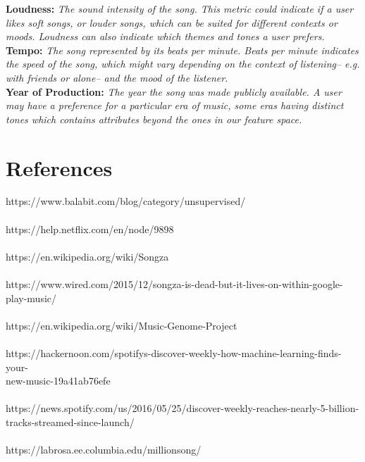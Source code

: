 \documentclass{amsart}
\theoremstyle{plain}
\theoremstyle{definition}
\begin{document}
  	\noindent \textbf{Loudness: }\textit{The sound intensity of the song. This metric could indicate if a user likes soft songs, or louder songs, which can be suited for different contexts or moods. Loudness can also indicate which themes and tones a user prefers.} \\
  	
  	\noindent \textbf{Tempo: }\textit{The song represented by its beats per minute. Beats per minute indicates the speed of the song, which might vary depending on the context of listening-- e.g. with friends or alone-- and the  mood of the listener.} \\
  	
  	\noindent \textbf{Year of Production: }\textit{The year the song was made publicly available. A user may have a preference for a particular era of music, some eras having distinct tones which contains attributes beyond the ones in our feature space.} \\
  	
  	
   	
   	
   	\section{References}
   	\noindent [a] https://www.balabit.com/blog/category/unsupervised/ \\ \\
   	\noindent [b] https://help.netflix.com/en/node/9898 \\ \\
   	\noindent [c] https://en.wikipedia.org/wiki/Songza \\ \\
   	\noindent [d] https://www.wired.com/2015/12/songza-is-dead-but-it-lives-on-within-google-play-music/ \\ \\
   	\noindent [e] https://en.wikipedia.org/wiki/Music-Genome-Project \\ \\ 
   	\noindent [f] https://hackernoon.com/spotifys-discover-weekly-how-machine-learning-finds-your- \\ new-music-19a41ab76efe \\ \\
   	\noindent [g] https://news.spotify.com/us/2016/05/25/discover-weekly-reaches-nearly-5-billion-tracks-streamed-since-launch/ \\ \\
   	\noindent [h] https://labrosa.ee.columbia.edu/millionsong/
   		
   
\end{document}
